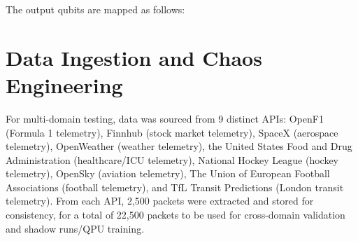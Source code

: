 \documentclass[journal]{IEEEtran}
\begin{document}
The output qubits are mapped as follows:
\vspace{1em}
\noindent
\begin{minipage}{\linewidth}
  \centering
  \small
  \label{tab:vqc_output_mapping}
\end{minipage}
\vspace{1em}


\section{Data Ingestion and Chaos Engineering}
For multi-domain testing, data was sourced from 9 distinct APIs: OpenF1 (Formula 1 telemetry), Finnhub (stock market telemetry), SpaceX (aerospace telemetry), OpenWeather (weather telemetry), the United States Food and Drug Administration (healthcare/ICU telemetry), National Hockey League (hockey telemetry), OpenSky (aviation telemetry), The Union of European Football Associations (football telemetry), and TfL Transit Predictions (London transit telemetry). From each API, 2,500 packets were extracted and stored for consistency, for a total of 22,500 packets to be used for cross-domain validation and shadow runs/QPU training.
\end{document}

